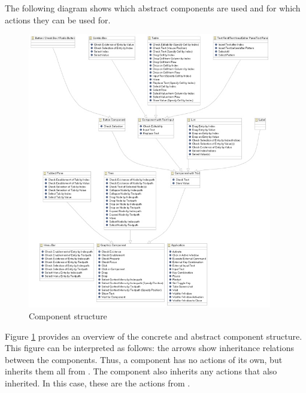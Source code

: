 \label{overviewabstcomp}
The following diagram shows which abstract components are used and for which actions they can be used for.  


\begin{figure}
\begin{center}
\includegraphics[width=0.95\textwidth]{Overview/PS/GUIdancerComponentHierarchysmall}
\caption{Component structure}
\label{comp}
\end{center}
\end{figure}

Figure \ref{comp} provides an overview of the concrete and abstract component structure. This figure can be interpreted as follows: the arrows show inheritance relations between the components. Thus, a  component has no actions of its own, but inherits them all from . The  component also inherits any actions that  also inherited. In this case, these are the actions from . 

\clearpage
